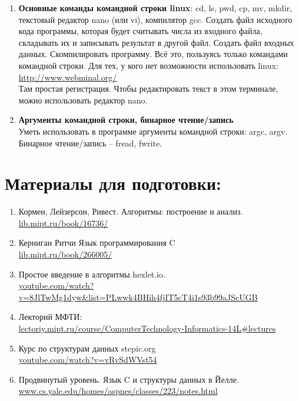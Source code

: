\documentclass{article}
\begin{document}
\begin{enumerate}
\item \textbf{Основные команды командной строки linux}: cd, ls, pwd, cp, mv, mkdir, текстовый редактор nano (или vi), компилятор gcc. Создать файл исходного кода программы, которая будет считывать числа из входного файла, складывать их и записывать результат в другой файл. Создать файл входных данных. Скомпилировать программу. Всё это, пользуясь только командами командной строки. Для тех, у кого нет возможности использовать linux:\\
\href{http://www.webminal.org/}{http://www.webminal.org/}\\
Там простая регистрация. Чтобы редактировать текст в этом терминале, можно использовать редактор nano.

\item \textbf{Аргументы командной строки, бинарное чтение/запись} \\
Уметь использовать в программе аргументы командной строки: argc, argv. Бинарное чтение/запись -- fread, fwrite.\\
\end{enumerate}


\section*{Материалы для подготовки:}
\begin{enumerate}
\item Кормен, Лейзерсон, Ривест. Алгоритмы: построение и анализ.\\ 
\hspace*{16pt} \href{https://lib.mipt.ru/book/16736/}{lib.mipt.ru/book/16736/}
\item Керниган Ритчи Язык программирования C \\
\hspace*{16pt} \href{https://lib.mipt.ru/book/266005/}{lib.mipt.ru/book/266005/}
\item Простое введение в алгоритмы hexlet.io. \\ \hspace*{16pt} \href{https://www.youtube.com/watch?v=8JlTwMg1dyw&list=PLwwk4BHih4fjIT5cT4i1s93b99aJScUGB}{youtube.com/watch?v=8JlTwMg1dyw\&list=PLwwk4BHih4fjIT5cT4i1s93b99aJScUGB}
\item Лекторий МФТИ: \\ \hspace*{16pt} 
\href{http://lectoriy.mipt.ru/course/ComputerTechnology-Informatics-14L#lectures}
{lectoriy.mipt.ru/course/ComputerTechnology-Informatics-14L\#lectures}
\item Курс по структурам данных stepic.org  \\
\hspace*{16pt} \href{https://www.youtube.com/watch?v=vRvSdWVst54}{youtube.com/watch?v=vRvSdWVst54}
\item Продвинутый уровень. Язык C и структуры данных в Йелле.\\ \hspace*{16pt} \href{http://www.cs.yale.edu/homes/aspnes/classes/223/notes.html}{www.cs.yale.edu/homes/aspnes/classes/223/notes.html}
\end{enumerate}
\end{document}

